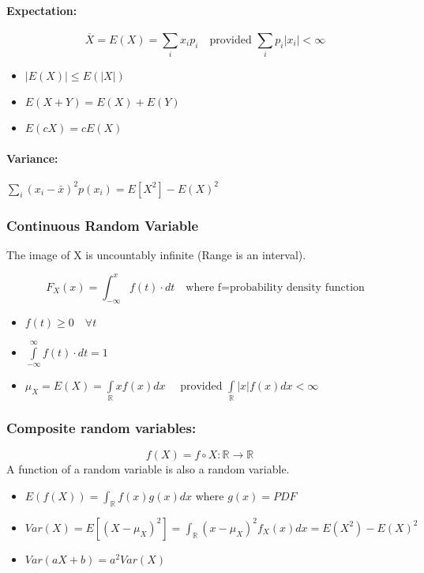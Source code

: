 \documentclass[12pt]{article}
\begin{document}
\paragraph{Expectation: }
\[ \overline{X}=  E(X) = \sum_i x_i p_i \quad \text{provided } \sum_i p_i |x_i| < \infty\]

\begin{itemize}
    \item $ |E(X)| \leq E(|X|)$
    \item $ E(X+Y) = E(X) +E(Y)$
    \item $ E(cX) = c E(X)$
\end{itemize}
\paragraph{Variance:}$\displaystyle{\sum_{i}(x_i-\bar{x})^2p(x_i) = E[X^2]- E(X)^2}$

\subsubsection{Continuous Random Variable}
The image of X is uncountably infinite (Range is an interval).

\[ F_X(x) = \int_{- \infty}^{x} f(t)\cdot dt \quad \text{where f=probability density function}\]
\begin{itemize}
    \item $f(t) \geq 0 \quad \forall t$
    \item $\int\limits_{- \infty}^{\infty} f(t) \cdot dt =1$
    \item $\mu_X = E(X) =  \int\limits_{\mathbb{R}}xf(x) dx \quad \text{ provided } \int\limits_{\mathbb{R}}|x|f(x) dx < \infty $
\end{itemize}

\subsubsection{Composite random variables: }
\[ f(X) = f \circ X: \mathbb{R} \rightarrow \mathbb{R} \quad\]
A function of a random variable is also a random variable.

\begin{itemize}
    \item $E(f(X)) = \int_{\mathbb{R}}f(x)g(x)dx$ \quad where $g(x)=PDF$
    \item $Var(X) = \displaystyle{E[(X-\mu_X)^2] = \int_{\mathbb{R}}(x-\mu_X)^2f_X (x) dx = E(X^2) - E(X)^2}$
    \item $Var(aX+b)= a^2 Var(X)$
\end{itemize}
\end{document}
